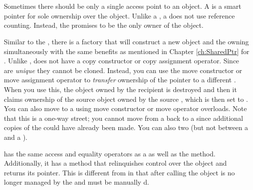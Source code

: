 \section{\uniqueptr}\label{ch:UniquePtr}

Sometimes there should be only a single access point to an object.
A \uniqueptr is a smart pointer for sole ownership over the object.
Unlike a \sharedptr, a \uniqueptr does not use reference counting.
Instead, the \uniqueptr promises to be the only owner of the object.

Similar to the \sharedptr, there is a  factory that will construct a new object and the owning \uniqueptr simultaneously with the same benefits as mentioned in Chapter \ref{ch:SharedPtr} for .
Unlike \sharedptr, \uniqueptr does not have a copy constructor or copy assignment operator.
Since \uniqueptrs are \emph{unique} they cannot be cloned.
Instead, you can use the move constructor or move assignment operator to \emph{transfer} ownership of the pointer to a different \uniqueptr.
When you use this, the object owned by the recipient \uniqueptr is destroyed and then it claims ownership of the source object owned by the source \uniqueptr, which is then set to \nullptr.
You can also move to a \sharedptr using move constructor or move operator overloads.
Note that this is a one-way street; you cannot move from a \sharedptr back to a \uniqueptr since additional copies of the \sharedptr could have already been made.
You can also  two \uniqueptrs (but not between a \uniqueptr and a \sharedptr).

\uniqueptr has the same access and equality operators as a \sharedptr as well as the  method.
Additionally, it has a  method that relinquishes control over the object and returns its pointer.
This is different from  in that after calling  the object is no longer managed by the \uniqueptr and must be manually d.